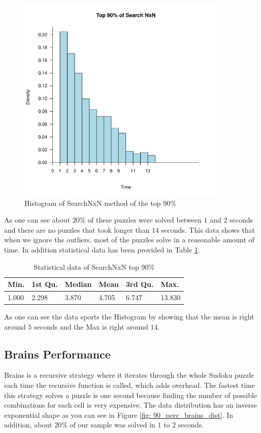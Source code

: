 \documentclass[letterpaper]{article}
\begin{document}
\begin{figure}[h]
	\centering
	\includegraphics[width=100mm]{../stats/Top90SearchNxN.pdf}
	\caption{Histogram of SearchNxN method of the top 90\%}
	\label{fig:search-time-complex-hist-90}
\end{figure}

As one can see about $20\%$ of these puzzles were solved between $1$ and $2$ seconds and there are no puzzles that took longer than $14$ seconds. This data shows that when we ignore the outliers, most of the puzzles solve in a reasonable amount of time. In addition statistical data has been provided in Table \ref{tab:SearchNxNTab2}.

\begin{table}[h]
\begin{tabular}{|l|l|l|l|l|l|}
\hline
Min. & 1st Qu.  & Median & Mean & 3rd Qu. & Max.\\
\hline
1.000 & 2.298 & 3.870 & 4.705 & 6.747 & 13.830\\
\hline
\end{tabular}
\caption{Statistical data of SearchNxN top 90\%}
\label{tab:SearchNxNTab2}
\end{table}

As one can see the data sports the Histogram by showing that the mean is right around $5$ seconds and the Max is right around $14$.

\subsection{Brains Performance}

Brains is a recursive strategy where it iterates through the whole Sudoku puzzle each time the recursive function is called, which adds overhead. The fastest time this strategy solves a puzzle is one second because finding the number of possible combinations for each cell is very expensive. The data distribution has an inverse exponential shape as you can see in Figure \ref{fig: 90_perc_brains_dist}. In addition, about $20\%$ of our sample was solved in $1$ to $2$ seconds.
\end{document}
